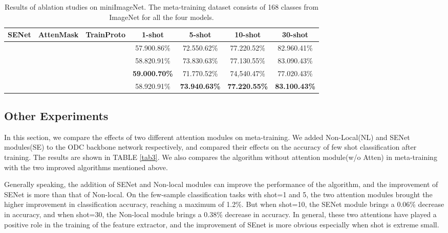 \documentclass[conference]{IEEEtran}
\begin{document}
\begin{table*}[htbp]
\caption{Results of ablation studies on miniImageNet. The meta-training dataset consists of 168 classes from ImageNet for all the four models.}
\begin{center}
\begin{tabular}{c c c | c c c c}
\hline
\textbf{SENet}&\textbf{AttenMask}&\textbf{TrainProto}&\textbf{1-shot}&\textbf{5-shot}&\textbf{10-shot}&\textbf{30-shot} \\
\hline
&&&57.900.86\% &72.550.62\% &77.220.52\%&82.960.41\% \\
& & &58.820.91\% &73.830.63\% &77.130.55\%&83.090.43\%\\
&& &\textbf{59.000.70\%} &71.770.52\% &74,540.47\%&77.020.43\% \\
& &&58.920.91\% &\textbf{73.940.63\%} &\textbf{77.220.55\%}&\textbf{83.100.43\%} \\
\hline
\end{tabular}
\label{tab2}
\end{center}
\end{table*}

\subsection{Other Experiments}
In this section, we compare the effects of two different attention modules on meta-training. We added Non-Local(NL) \cite{wang2018non} and SENet modules(SE) to the ODC backbone network respectively, and compared their effects on the accuracy of few shot classification after training. The results are shown in TABLE \ref{tab3}. We also compares the algorithm without attention module(w/o Atten) in meta-training with the two improved algorithms mentioned above.

Generally speaking, the addition of SENet and Non-local modules can improve the performance of the algorithm, and the improvement of SENet is more than that of Non-local. On the few-sample classification tasks with shot=1 and 5, the two attention modules brought the higher improvement in classification accuracy, reaching a maximum of 1.2\%. But when shot=10, the SENet module brings a 0.06\% decrease in accuracy, and when shot=30, the Non-local module brings a 0.38\% decrease in accuracy. In general, these two attentions have played a positive role in the training of the feature extractor, and the improvement of SEnet is more obvious especially when shot is extreme small.
\end{document}
